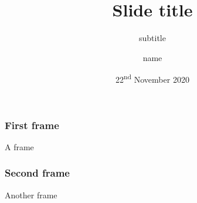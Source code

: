\documentclass{beamer}
\title{Slide title}
\subtitle{subtitle}
\institute[University of Somewhere]{School of Mathematical Sciences}
\author{
name
}
\date{22\textsuperscript{nd} November 2020}
\theoremstyle{plain}
\begin{document}
	\begin{frame}[plain]
\titlepage
	\end{frame}
	\begin{frame}
	\frametitle{First frame}
A frame
	\end{frame}
	\begin{frame}
	\frametitle{Second frame}
Another frame
	\end{frame}
\end{document}

